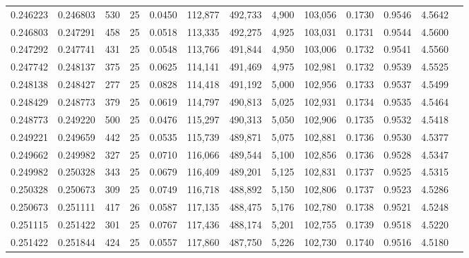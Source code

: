 \begin{tabular}{rrrrrrrrrrrrr}
0.246223 & 0.246803 &   530 &  25 &                                     0.0450 & 112,877 & 492,733 &   4,900 & 103,056 & 0.1730 & 0.9546 & 4.5642 \\
0.246803 & 0.247291 &   458 &  25 &                                     0.0518 & 113,335 & 492,275 &   4,925 & 103,031 & 0.1731 & 0.9544 & 4.5600 \\
0.247292 & 0.247741 &   431 &  25 &                                     0.0548 & 113,766 & 491,844 &   4,950 & 103,006 & 0.1732 & 0.9541 & 4.5560 \\
0.247742 & 0.248137 &   375 &  25 &                                     0.0625 & 114,141 & 491,469 &   4,975 & 102,981 & 0.1732 & 0.9539 & 4.5525 \\
0.248138 & 0.248427 &   277 &  25 &                                     0.0828 & 114,418 & 491,192 &   5,000 & 102,956 & 0.1733 & 0.9537 & 4.5499 \\
0.248429 & 0.248773 &   379 &  25 &                                     0.0619 & 114,797 & 490,813 &   5,025 & 102,931 & 0.1734 & 0.9535 & 4.5464 \\
0.248773 & 0.249220 &   500 &  25 &                                     0.0476 & 115,297 & 490,313 &   5,050 & 102,906 & 0.1735 & 0.9532 & 4.5418 \\
0.249221 & 0.249659 &   442 &  25 &                                     0.0535 & 115,739 & 489,871 &   5,075 & 102,881 & 0.1736 & 0.9530 & 4.5377 \\
0.249662 & 0.249982 &   327 &  25 &                                     0.0710 & 116,066 & 489,544 &   5,100 & 102,856 & 0.1736 & 0.9528 & 4.5347 \\
0.249982 & 0.250328 &   343 &  25 &                                     0.0679 & 116,409 & 489,201 &   5,125 & 102,831 & 0.1737 & 0.9525 & 4.5315 \\
0.250328 & 0.250673 &   309 &  25 &                                     0.0749 & 116,718 & 488,892 &   5,150 & 102,806 & 0.1737 & 0.9523 & 4.5286 \\
0.250673 & 0.251111 &   417 &  26 &                                     0.0587 & 117,135 & 488,475 &   5,176 & 102,780 & 0.1738 & 0.9521 & 4.5248 \\
0.251115 & 0.251422 &   301 &  25 &                                     0.0767 & 117,436 & 488,174 &   5,201 & 102,755 & 0.1739 & 0.9518 & 4.5220 \\
0.251422 & 0.251844 &   424 &  25 &                                     0.0557 & 117,860 & 487,750 &   5,226 & 102,730 & 0.1740 & 0.9516 & 4.5180 \\

\end{tabular}
